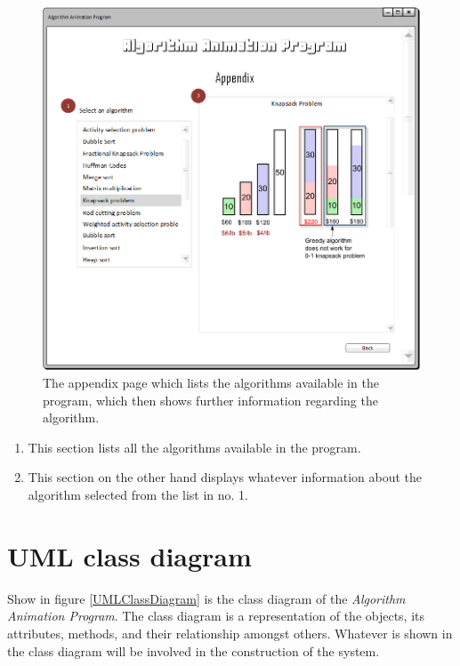 \begin{figure}[H]
\centering
\hspace*{-0.5cm}
\includegraphics[scale=0.8]{images/report_images/uiAppendix.png}
\caption{The appendix page which lists the algorithms available in the program, which then shows further information regarding the algorithm.}
\label{uiAppendix}
\end{figure}

\begin{enumerate}
\item This section lists all the algorithms available in the program.
\item This section on the other hand displays whatever information about the algorithm selected from the list in no. 1.
\end{enumerate}

\newpage


\section{UML class diagram}

Show in figure \ref{UMLClassDiagram} is the class diagram of the \textit{Algorithm Animation Program}. The class diagram is a representation of the objects, its attributes, methods, and their relationship amongst others. Whatever is shown in the class diagram will be involved in the construction of the system. 

